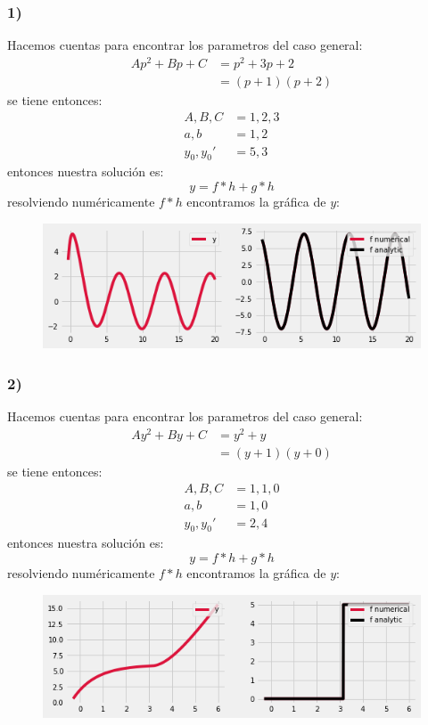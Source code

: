 \documentclass{article}
\begin{document}
\begin{tcolorbox}
    \subsubsection*{1)}
    Hacemos cuentas para encontrar los parametros del caso general:
    \begin{align*}
        Ap^2 + Bp + C 
        &= p^2 + 3p + 2 \\
        &= (p+1)(p+2) 
    \end{align*}
    se tiene entonces:
    \begin{align*}
        A, B, C &= 1, 2, 3 \\ 
        a, b &= 1, 2 \\
        y_0, y_0' &= 5, 3
    \end{align*}
    entonces nuestra solución es:
    \[ y = f*h + g*h \]
    resolviendo numéricamente $f*h$ encontramos la gráfica de $y$:
    \begin{figure}[H]
        \centering
        \includegraphics[scale=0.7]{images/p1_1.png}
    \end{figure}

    \subsubsection*{2)}
    Hacemos cuentas para encontrar los parametros del caso general:
    \begin{align*}
        Ay^2 + By + C 
        &= y^2 + y \\
        &= (y+1)(y+0)
    \end{align*}
    se tiene entonces:
    \begin{align*}
        A, B, C &= 1,1,0 \\ 
        a,b &= 1,0 \\
        y_0, y_0' &= 2, 4
    \end{align*}
    entonces nuestra solución es:
    \[ y = f*h + g*h \]
    resolviendo numéricamente $f*h$ encontramos la gráfica de $y$:
    \begin{figure}[H]
        \centering
        \includegraphics[scale=0.7]{images/p1_2.png}
    \end{figure}
\end{tcolorbox}
\end{document}
